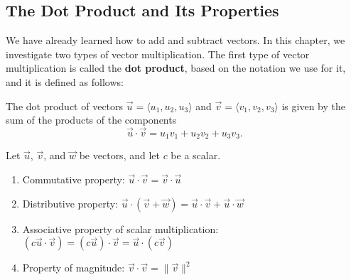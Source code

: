 \documentclass{report}
\begin{document}
    \subsection{The Dot Product and Its Properties}
    \bigbreak \noindent 
    We have already learned how to add and subtract vectors. In this chapter, we investigate two types of vector multiplication. The first type of vector multiplication is called the \textbf{dot product}, based on the notation we use for it, and it is defined as follows:
    \bigbreak \noindent 
    \begin{dfn}
        The dot product of vectors $\vec{u} = \langle u_1, u_2, u_3 \rangle$ and $\vec{v} = \langle v_1, v_2, v_3 \rangle$ is given by the sum of the products of the components
        \[
            \vec{u} \cdot \vec{v} = u_1v_1 + u_2v_2 + u_3v_3.
        \]
    \end{dfn}
    \bigbreak \noindent 
    \bigbreak \noindent 
    \begin{dfn}
        Let $\vec{u}$, $\vec{v}$, and $\vec{w}$ be vectors, and let $c$ be a scalar.
        \begin{enumerate}
            \item Commutative property: $\vec{u} \cdot \vec{v} = \vec{v} \cdot \vec{u}$
            \item Distributive property: $\vec{u} \cdot (\vec{v} + \vec{w}) = \vec{u} \cdot \vec{v} + \vec{u} \cdot \vec{w}$
            \item Associative property of scalar multiplication: $(c\vec{u} \cdot \vec{v}) = (c\vec{u}) \cdot \vec{v} = \vec{u} \cdot (c\vec{v})$
            \item Property of magnitude: $\vec{v} \cdot \vec{v} = \|\vec{v}\|^2$
        \end{enumerate}
    \end{dfn}

    \pagebreak 
\end{document}
